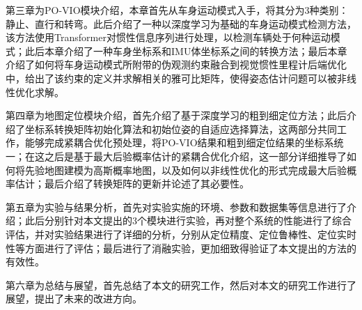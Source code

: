 第三章为PO-VIO模块介绍，本章首先从车身运动模式入手，将其分为3种类别：静止、直行和转弯。此后介绍了一种以深度学习为基础的车身运动模式检测方法，该方法使用Transformer\cite{vaswani2017attention}对惯性信息序列进行处理，以检测车辆处于何种运动模式；此后本章介绍了一种车身坐标系和IMU体坐标系之间的转换方法；最后本章介绍了如何将车身运动模式所附带的伪观测约束融合到视觉惯性里程计后端优化中，给出了该约束的定义并求解相关的雅可比矩阵，使得姿态估计问题可以被非线性优化求解。

第四章为地图定位模块介绍，首先介绍了基于深度学习的粗到细定位方法；此后介绍了坐标系转换矩阵初始化算法和初始位姿的自适应选择算法，这两部分共同工作，能够完成紧耦合优化预处理，将PO-VIO结果和粗到细定位结果的坐标系统一；在这之后是基于最大后验概率估计的紧耦合优化介绍，这一部分详细推导了如何将先验地图建模为高斯概率地图，以及如何以非线性优化的形式完成最大后验概率估计；最后介绍了转换矩阵的更新并论述了其必要性。

第五章为实验与结果分析，首先对实验实施的环境、参数和数据集等信息进行了介绍；此后分别针对本文提出的3个模块进行实验，再对整个系统的性能进行了综合评估，并对实验结果进行了详细的分析，分别从定位精度、定位鲁棒性、定位实时性等方面进行了评估；最后进行了消融实验，更加细致得验证了本文提出的方法的有效性。

第六章为总结与展望，首先总结了本文的研究工作，然后对本文的研究工作进行了展望，提出了未来的改进方向。